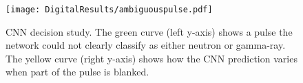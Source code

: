 \documentclass[main.tex]{subfiles}
\begin{document}
\begin{appendices}
\begin{figure}[h!]
    \centering
        \texttt{[image: DigitalResults/ambiguouspulse.pdf]}
        \caption[CNN decision study.]{CNN decision study. The green curve (left y-axis) shows a pulse the network could not clearly classify as either neutron or gamma-ray. The yellow curve (right y-axis) shows how the CNN prediction varies when part of the pulse is blanked.}
    \label{fig:occl} 
\end{figure}


\end{appendices}
\end{document}
